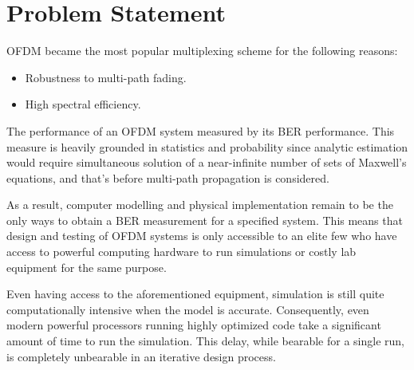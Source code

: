 \section{Problem Statement}
\gls{OFDM} became the most popular multiplexing scheme for the following reasons:
\begin{itemize}
	\item Robustness to multi-path fading.
	\item High spectral efficiency.
\end{itemize}
The performance of an \gls{OFDM} system measured by its \gls{BER} performance. This measure is heavily grounded in statistics and probability since analytic estimation would require simultaneous solution of a near-infinite number of sets of Maxwell's equations, and that's before multi-path propagation is considered.

As a result, computer modelling and physical implementation remain to be the only ways to obtain a \gls{BER} measurement for a specified system. This means that design and testing of \gls{OFDM} systems is only accessible to an elite few who have access to powerful computing hardware to run simulations or costly lab equipment for the same purpose.

Even having access to the aforementioned equipment, simulation is still quite computationally intensive when the model is accurate. Consequently, even modern powerful processors running highly optimized code take a significant amount of time to run the simulation. This delay, while bearable for a single run, is completely unbearable in an iterative design process.


